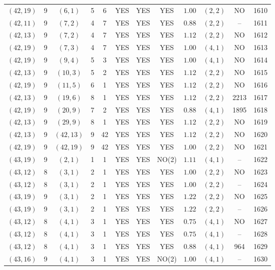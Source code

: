 \begin{longtable}{|c|c|c|c|c|c|c|c|c|c|c|c|}
$(42,19)$ & 9 & $(6,1)$ & 5 & 6 & YES & YES & YES & $1.00$ & $(2,2)$ & NO & 1610\\
$(42,11)$ & 9 & $(7,2)$ & 4 & 7 & YES & YES & YES & $0.88$ & $(2,2)$ & -- & 1611\\
$(42,13)$ & 9 & $(7,2)$ & 4 & 7 & YES & YES & YES & $1.12$ & $(2,2)$ & NO & 1612\\
$(42,19)$ & 9 & $(7,3)$ & 4 & 7 & YES & YES & YES & $1.00$ & $(4,1)$ & NO & 1613\\
$(42,19)$ & 9 & $(9,4)$ & 5 & 3 & YES & YES & YES & $1.00$ & $(4,1)$ & NO & 1614\\
$(42,13)$ & 9 & $(10,3)$ & 5 & 2 & YES & YES & YES & $1.12$ & $(2,2)$ & NO & 1615\\
$(42,19)$ & 9 & $(11,5)$ & 6 & 1 & YES & YES & YES & $1.12$ & $(2,2)$ & NO & 1616\\
$(42,13)$ & 9 & $(19,6)$ & 8 & 1 & YES & YES & YES & $1.12$ & $(2,2)$ & 2213 & 1617\\
$(42,19)$ & 9 & $(20,9)$ & 7 & 2 & YES & YES & YES & $0.88$ & $(4,1)$ & 1895 & 1618\\
$(42,13)$ & 9 & $(29,9)$ & 8 & 1 & YES & YES & YES & $1.12$ & $(2,2)$ & NO & 1619\\
$(42,13)$ & 9 & $(42,13)$ & 9 & 42 & YES & YES & YES & $1.12$ & $(2,2)$ & NO & 1620\\
$(42,19)$ & 9 & $(42,19)$ & 9 & 42 & YES & YES & YES & $1.00$ & $(2,2)$ & NO & 1621\\
$(43,19)$ & 9 & $(2,1)$ & 1 & 1 & YES & YES & NO(2) & $1.11$ & $(4,1)$ & -- & 1622\\
$(43,12)$ & 8 & $(3,1)$ & 2 & 1 & YES & YES & YES & $1.00$ & $(2,2)$ & NO & 1623\\
$(43,12)$ & 8 & $(3,1)$ & 2 & 1 & YES & YES & YES & $1.00$ & $(2,2)$ & -- & 1624\\
$(43,19)$ & 9 & $(3,1)$ & 2 & 1 & YES & YES & YES & $1.22$ & $(2,2)$ & NO & 1625\\
$(43,19)$ & 9 & $(3,1)$ & 2 & 1 & YES & YES & YES & $1.22$ & $(2,2)$ & -- & 1626\\
$(43,12)$ & 8 & $(4,1)$ & 3 & 1 & YES & YES & YES & $0.75$ & $(4,1)$ & NO & 1627\\
$(43,12)$ & 8 & $(4,1)$ & 3 & 1 & YES & YES & YES & $0.75$ & $(4,1)$ & -- & 1628\\
$(43,12)$ & 8 & $(4,1)$ & 3 & 1 & YES & YES & YES & $0.88$ & $(4,1)$ & 964 & 1629\\
$(43,16)$ & 9 & $(4,1)$ & 3 & 1 & YES & YES & NO(2) & $1.00$ & $(4,1)$ & -- & 1630\\

\end{longtable}
